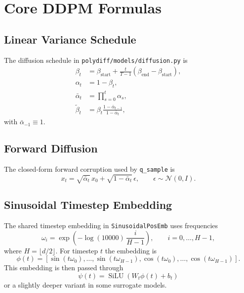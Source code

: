 \documentclass[11pt]{article}
\newcommand{\SiLU}{\operatorname{SiLU}}
\begin{document}
\section{Core DDPM Formulas}
\subsection{Linear Variance Schedule}
The diffusion schedule in \texttt{polydiff/models/diffusion.py} is
\begin{align}
\beta_t &= \beta_{\mathrm{start}} + \frac{t}{T-1}\left(\beta_{\mathrm{end}} - \beta_{\mathrm{start}}\right), \\
\alpha_t &= 1 - \beta_t, \\
\bar{\alpha}_t &= \prod_{s=0}^{t} \alpha_s, \\
\tilde{\beta}_t &= \beta_t \frac{1 - \bar{\alpha}_{t-1}}{1 - \bar{\alpha}_t},
\end{align}
with $\bar{\alpha}_{-1} \equiv 1$.

\subsection{Forward Diffusion}
The closed-form forward corruption used by \texttt{q\_sample} is
\begin{equation}
x_t = \sqrt{\bar{\alpha}_t}\,x_0 + \sqrt{1-\bar{\alpha}_t}\,\epsilon,
\qquad \epsilon \sim \mathcal{N}(0, I).
\end{equation}

\subsection{Sinusoidal Timestep Embedding}
The shared timestep embedding in \texttt{SinusoidalPosEmb} uses frequencies
\begin{equation}
\omega_i = \exp\!\left(-\log(10000)\,\frac{i}{H-1}\right),
\qquad i = 0,\dots,H-1,
\end{equation}
where $H = \lfloor d/2 \rfloor$. For timestep $t$ the embedding is
\begin{equation}
\phi(t) =
\left[
\sin(t \omega_0), \dots, \sin(t \omega_{H-1}),
\cos(t \omega_0), \dots, \cos(t \omega_{H-1})
\right].
\end{equation}
This embedding is then passed through
\begin{equation}
\psi(t) = \SiLU\!\left(W_t \phi(t) + b_t\right)
\end{equation}
or a slightly deeper variant in some surrogate models.
\end{document}
